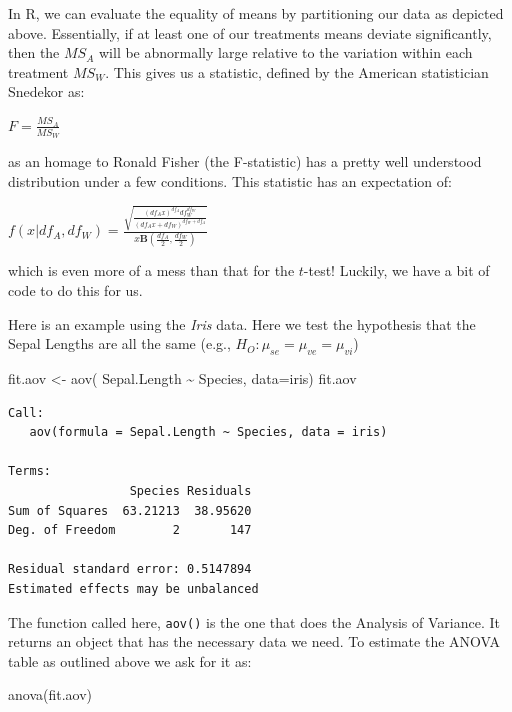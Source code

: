 \documentclass[
  letterpaper,
]{book}
\newenvironment{Shaded}{\begin{snugshade}}{\end{snugshade}}
\newcommand{\AttributeTok}[1]{\textcolor[rgb]{0.40,0.45,0.13}{#1}}
\newcommand{\FunctionTok}[1]{\textcolor[rgb]{0.28,0.35,0.67}{#1}}
\newcommand{\NormalTok}[1]{\textcolor[rgb]{0.00,0.23,0.31}{#1}}
\newcommand{\OtherTok}[1]{\textcolor[rgb]{0.00,0.23,0.31}{#1}}
\newcommand{\SpecialCharTok}[1]{\textcolor[rgb]{0.37,0.37,0.37}{#1}}
\begin{document}
In R, we can evaluate the equality of means by partitioning our data as
depicted above. Essentially, if at least one of our treatments means
deviate significantly, then the \(MS_A\) will be abnormally large
relative to the variation within each treatment \(MS_W\). This gives us
a statistic, defined by the American statistician Snedekor as:

\(F = \frac{MS_A}{MS_W}\)

as an homage to Ronald Fisher (the F-statistic) has a pretty well
understood distribution under a few conditions. This statistic has an
expectation of:

\(f(x | df_A, df_W) = \frac{\sqrt{\frac{(df_Ax)^{df_A}df_W^{df_W}}{(df_Ax + df_W)^{df_W+df_A}}}}{x\mathbf{B}\left( \frac{df_A}{2}, \frac{df_W}{2} \right)}\)

which is even more of a mess than that for the \(t\)-test! Luckily, we
have a bit of code to do this for us.

Here is an example using the \emph{Iris} data. Here we test the
hypothesis that the Sepal Lengths are all the same (e.g.,
\(H_O: \mu_{se} = \mu_{ve} = \mu_{vi}\))

\begin{Shaded}
\begin{Highlighting}[]
\NormalTok{fit.aov }\OtherTok{\textless{}{-}} \FunctionTok{aov}\NormalTok{( Sepal.Length }\SpecialCharTok{\textasciitilde{}}\NormalTok{ Species, }\AttributeTok{data=}\NormalTok{iris)}
\NormalTok{fit.aov}
\end{Highlighting}
\end{Shaded}

\begin{verbatim}
Call:
   aov(formula = Sepal.Length ~ Species, data = iris)

Terms:
                 Species Residuals
Sum of Squares  63.21213  38.95620
Deg. of Freedom        2       147

Residual standard error: 0.5147894
Estimated effects may be unbalanced
\end{verbatim}

The function called here, \texttt{aov()} is the one that does the
Analysis of Variance. It returns an object that has the necessary data
we need. To estimate the ANOVA table as outlined above we ask for it as:

\begin{Shaded}
\begin{Highlighting}[]
\FunctionTok{anova}\NormalTok{(fit.aov)}
\end{Highlighting}
\end{Shaded}
\end{document}
